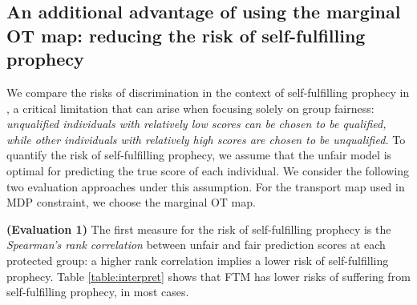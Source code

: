 \documentclass[10pt]{article} %
\begin{document}
\clearpage

\subsection{An additional advantage of using the marginal OT map: reducing the risk of self-fulfilling prophecy}

We compare the risks of discrimination in the context of self-fulfilling prophecy in \citet{10.1145/2090236.2090255}, a critical limitation that can arise when focusing solely on group fairness:
\textit{unqualified individuals with relatively low scores can be chosen to be qualified, while other individuals with relatively high scores are chosen to be unqualified.}
To quantify the risk of self-fulfilling prophecy, we assume that the unfair model is optimal for predicting the true score of each individual.
We consider the following two evaluation approaches under this assumption.
For the transport map used in MDP constraint, we choose the marginal OT map.

\textbf{(Evaluation 1)}
The first measure for the risk of self-fulfilling prophecy is the \textit{Spearman's rank correlation} between unfair and fair prediction scores at each protected group: a higher rank correlation implies a lower risk of self-fulfilling prophecy.
Table \ref{table:interpret} shows that FTM has lower risks of suffering from self-fulfilling prophecy, in most cases.
\end{document}
